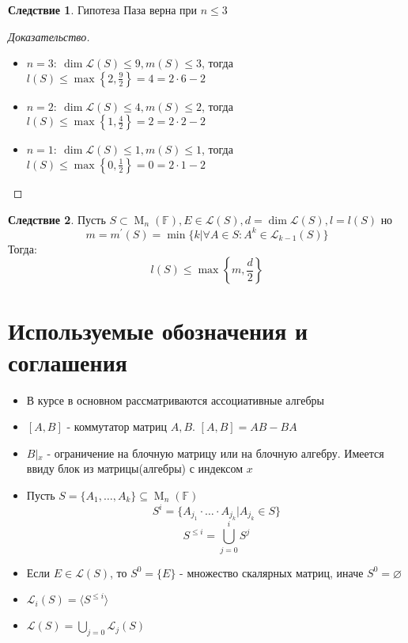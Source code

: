 \documentclass[a4paper, 14pt]{extarticle}
\theoremstyle{definition}
\newtheorem{conseq}{Следствие}
\begin{document}
\begin{conseq}
	Гипотеза Паза верна при \(n \leqslant 3\)
\end{conseq}

\begin{proof}[Доказательство]
	\leavevmode
	\begin{itemize}
		\item \(n = 3:\ \operatorname{dim} \mathcal{L}(S) \leqslant 9, m(S) \leqslant 3\), тогда \(l(S) \leqslant \operatorname{max} \left\{ 2, \frac{9}{2} \right\} = 4 = 2 \cdot 6 - 2\)
		
		\item \(n = 2:\ \operatorname{dim} \mathcal{L}(S) \leqslant 4, m(S) \leqslant 2\), тогда \(l(S) \leqslant \operatorname{max} \left\{ 1, \frac{4}{2} \right\} = 2 = 2 \cdot 2 - 2\)
		
		\item \(n = 1:\ \operatorname{dim} \mathcal{L}(S) \leqslant 1, m(S) \leqslant 1\), тогда \(l(S) \leqslant \operatorname{max} \left\{ 0, \frac{1}{2} \right\} = 0 = 2 \cdot 1 - 2\)
	\end{itemize}
\end{proof}

\begin{conseq}
	Пусть \(S \subset \operatorname{M}_n(\mathbb{F}), E \in \mathcal{L}(S), d = \operatorname{dim} \mathcal{L}(S), l = l(S)\) но
	\[m = m^{\prime}(S) = \operatorname{min} \{k | \forall A \in S : A^k \in \mathcal{L}_{k - 1}(S)\}\]
	Тогда:
	\[l(S) \leqslant \operatorname{max} \left\{ m, \frac{d}{2} \right\}\]
\end{conseq}

\newpage
\section{Используемые обозначения и соглашения}

\begin{itemize}
	\item В курсе в основном рассматриваются ассоциативные алгебры
	\item \([A, B]\) - коммутатор матриц \(A, B\). \([A, B] = AB - BA\)
	\item \(B \left|_{x} \right.\) - ограничение на блочную матрицу или на блочную алгебру. Имеется ввиду блок из матрицы(алгебры) с индексом \(x\)
	\item Пусть \(S = \{A_1, \dots, A_k\} \subseteq \operatorname{M}_n(\mathbb{F})\)
	\[S^i = \{A_{j_1} \cdot \dots \cdot A_{j_k} | A_{j_k} \in S\}\]
	\[S^{\leqslant i} = \bigcup\limits_{j = 0}^i S^{j}\]
	\item Если \(E \in \mathcal{L}(S)\), то \(S^0 = \{E\}\) - множество скалярных матриц, иначе \(S^0 = \varnothing\)
	\item \(\mathcal{L}_i(S) = \langle S^{\leqslant i} \rangle\)
	\item \(\mathcal{L}(S) = \bigcup\limits_{j = 0} \mathcal{L}_j(S)\)
\end{itemize}
\end{document}
